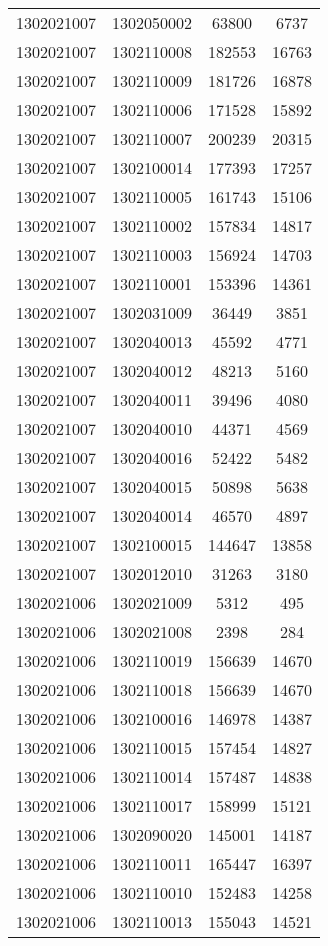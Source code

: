 \begin{longtable}{llcc}
1302021007 & 1302050002 & 63800 & 6737\\
1302021007 & 1302110008 & 182553 & 16763\\
1302021007 & 1302110009 & 181726 & 16878\\
1302021007 & 1302110006 & 171528 & 15892\\
1302021007 & 1302110007 & 200239 & 20315\\
1302021007 & 1302100014 & 177393 & 17257\\
1302021007 & 1302110005 & 161743 & 15106\\
1302021007 & 1302110002 & 157834 & 14817\\
1302021007 & 1302110003 & 156924 & 14703\\
1302021007 & 1302110001 & 153396 & 14361\\
1302021007 & 1302031009 & 36449 & 3851\\
1302021007 & 1302040013 & 45592 & 4771\\
1302021007 & 1302040012 & 48213 & 5160\\
1302021007 & 1302040011 & 39496 & 4080\\
1302021007 & 1302040010 & 44371 & 4569\\
1302021007 & 1302040016 & 52422 & 5482\\
1302021007 & 1302040015 & 50898 & 5638\\
1302021007 & 1302040014 & 46570 & 4897\\
1302021007 & 1302100015 & 144647 & 13858\\
1302021007 & 1302012010 & 31263 & 3180\\
1302021006 & 1302021009 & 5312 & 495\\
1302021006 & 1302021008 & 2398 & 284\\
1302021006 & 1302110019 & 156639 & 14670\\
1302021006 & 1302110018 & 156639 & 14670\\
1302021006 & 1302100016 & 146978 & 14387\\
1302021006 & 1302110015 & 157454 & 14827\\
1302021006 & 1302110014 & 157487 & 14838\\
1302021006 & 1302110017 & 158999 & 15121\\
1302021006 & 1302090020 & 145001 & 14187\\
1302021006 & 1302110011 & 165447 & 16397\\
1302021006 & 1302110010 & 152483 & 14258\\
1302021006 & 1302110013 & 155043 & 14521\\

\end{longtable}

